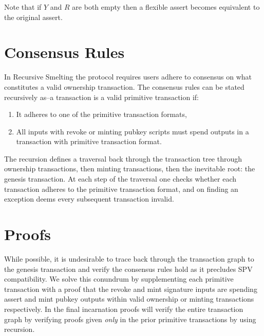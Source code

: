 \documentclass[9pt,oneside]{amsart}
\begin{document}
\begin{multicols}{2}
Note that if $Y$ and $R$ are both empty then a flexible assert becomes equivalent to the original assert.


\section{Consensus Rules}
In Recursive Smelting the protocol requires users adhere to consensus on what constitutes a valid ownership transaction. The consensus rules can be stated recursively as--a  transaction is a valid primitive transaction if:
    \begin{enumerate}
        \item It adheres to one of the primitive transaction formats,
        \item All inputs with revoke or minting pubkey scripts must  spend outputs in a transaction with primitive transaction format.
    \end{enumerate}
    
The recursion defines a traversal back through the transaction tree through ownership transactions, then minting transactions, then the inevitable root: the genesis transaction. At each step of the traversal one checks whether each transaction adheres to the primitive transaction format, and on finding an exception deems every subsequent transaction invalid.

    
\section{Proofs}
While possible, it is undesirable to trace back through the transaction graph to the genesis transaction and verify the consensus rules hold as it precludes SPV compatibility. We solve this conundrum by supplementing each primitive transaction with a proof that the revoke and mint signature inputs are spending assert and mint pubkey outputs within valid ownership or minting transactions respectively. In the final incarnation proofs will verify the entire transaction graph by verifying proofs given \emph{only} in the prior primitive transactions by using recursion.


\end{multicols}
\end{document}
